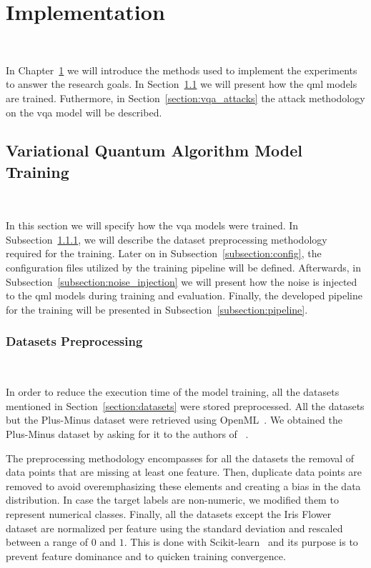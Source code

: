 \chapter{Implementation}\label{chapter:implementation} \

In Chapter~\ref{chapter:implementation} we will introduce
the methods used to implement the experiments to answer
the research goals. In Section~\ref{section:vqa_training}
we will present how the \ac{qml} models are trained.
Futhermore, in Section~\ref{section:vqa_attacks} the
attack methodology on the \ac{vqa} model will be described. \

\section{Variational Quantum Algorithm Model Training}\label{section:vqa_training} \

In this section we will specify how the \ac{vqa} models
were trained. In Subsection~\ref{subsection:preprocess},
we will describe the dataset preprocessing methodology required
for the training. Later on in Subsection~\ref{subsection:config},
the configuration files utilized by the training pipeline will
be defined. Afterwards, in Subsection~\ref{subsection:noise_injection}
we will present how the noise is injected to the
\ac{qml} models during training and evaluation.
Finally, the developed pipeline for the training will
be presented in Subsection~\ref{subsection:pipeline}. \

\subsection{Datasets Preprocessing}\label{subsection:preprocess} \

In order to reduce the execution time of the model training, all the
datasets mentioned in Section~\ref{section:datasets} were
stored preprocessed. All the datasets but the Plus-Minus dataset
were retrieved using OpenML~\cite{vanschoren_openml_2014}. We
obtained the Plus-Minus dataset by asking for it to the authors of 
~\cite{wendlinger_comparative_2024}. \

The preprocessing methodology encompasses for all the datasets the
removal of data points that are missing at least one feature.
Then, duplicate data points are removed to avoid overemphasizing
these elements and creating a bias in the data distribution. In
case the target labels are non-numeric, we modified them to
represent numerical classes. Finally, all the datasets except
the Iris Flower dataset are normalized per feature using the standard
deviation and rescaled between a range of \(0\) and \(1\). This
is done with Scikit-learn~\cite{pedregosa_scikit-learn_2011}
and its purpose is to prevent feature dominance and to quicken
training convergence. \

